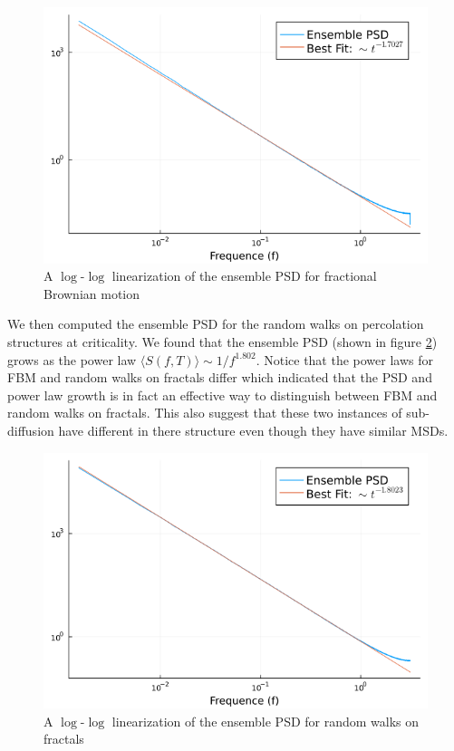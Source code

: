 \documentclass[%
 reprint,
 amsmath,amssymb,
 aps,
]{revtex4-2}
\begin{document}
\begin{figure}
    \centering
    \includegraphics[scale=.36]{lin_ens_psd_fbm.png}
    \caption{A $\log$-$\log$ linearization of the ensemble PSD for fractional Brownian motion}
    \label{fig:lin_psd_fbm}
\end{figure}

We then computed the ensemble PSD for the random walks on percolation structures at criticality. We found that the ensemble PSD (shown in figure \ref{fig:lin_psd_frac}) grows as the power law $\langle S(f,T) \rangle\sim 1/f^{1.802}$. Notice that the power laws for FBM and random walks on fractals differ which indicated that the PSD and power law growth is in fact an effective way to distinguish between FBM and random walks on fractals. This also suggest that these two instances of sub-diffusion have different in there structure even though they have similar MSDs.

\begin{figure}
    \centering
    \includegraphics[scale=.36]{lin_ens_psd_frac.png}
    \caption{A $\log$-$\log$ linearization of the ensemble PSD for random walks on fractals}
    \label{fig:lin_psd_frac}
\end{figure}
\end{document}
